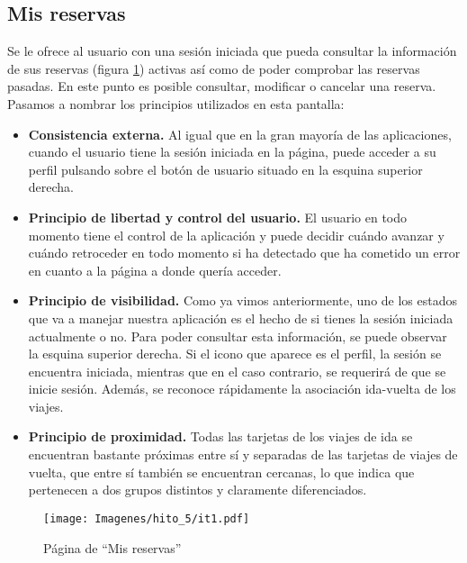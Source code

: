 \subsection*{Mis reservas}

Se le ofrece al usuario con una sesión iniciada que pueda consultar la información de sus reservas (figura \ref{fig:it1_reservas})
activas así como de poder comprobar las reservas pasadas. En este punto es posible consultar, modificar o cancelar
una reserva. Pasamos a nombrar los principios utilizados en esta pantalla: 

\begin{itemize}
    \item \textbf{Consistencia externa.} Al igual que en la gran mayoría de las aplicaciones, cuando el usuario
        tiene la sesión iniciada en la página, puede acceder a su perfil pulsando sobre el botón de usuario situado
        en la esquina superior derecha.
    \item \textbf{Principio de libertad y control del usuario.} El usuario en todo momento tiene el control de la
        aplicación y puede decidir cuándo avanzar y cuándo retroceder en todo momento si ha detectado que ha
        cometido un error en cuanto a la página a donde quería acceder.
    \item \textbf{Principio de visibilidad.} Como ya vimos anteriormente, uno de los estados que va a manejar
        nuestra aplicación es el hecho de si tienes la sesión iniciada actualmente o no. Para poder consultar
        esta información, se puede observar la esquina superior derecha. Si el icono que aparece es el perfil,
        la sesión se encuentra iniciada, mientras que en el caso contrario, se requerirá de que se inicie sesión. Además,
        se reconoce rápidamente la asociación ida-vuelta de los viajes.
    \item \textbf{Principio de proximidad.} Todas las tarjetas de los viajes de ida se encuentran bastante próximas entre sí
        y separadas de las tarjetas de viajes de vuelta, que entre sí también se encuentran cercanas, lo que indica
        que pertenecen a dos grupos distintos y claramente diferenciados.
\end{itemize}

\begin{figure}[H]
    \centering
    \texttt{[image: Imagenes/hito\_5/it1.pdf]}
    \caption{Página de ``Mis reservas''}
    \label{fig:it1_reservas}
\end{figure}

